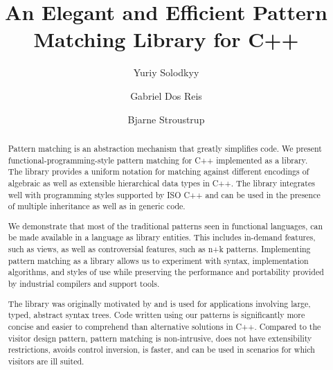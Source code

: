 \documentclass{llncs}
\makeatletter
\DeclareRobustCommand{\code}[1]{{\lstinline[keepspaces,breaklines=false,escapechar=@]{#1}}}
\makeatother
\begin{document}
%
\frontmatter          %
%
\pagestyle{headings}  %



\title{An Elegant and Efficient Pattern Matching Library for C++}

\author{Yuriy Solodkyy\and Gabriel Dos Reis\and Bjarne Stroustrup}
%
%
%

\maketitle              %

\begin{abstract}
Pattern matching is an abstraction mechanism that greatly simplifies code. We 
present functional-programming-style pattern matching for C++ implemented as a 
library. The library provides a uniform notation for matching against different 
encodings of algebraic as well as extensible hierarchical data types in C++. The 
library integrates well with programming styles supported by ISO C++ and can be 
used in the presence of multiple inheritance as well as in generic code.

We demonstrate that most of the traditional patterns seen in functional 
languages, can be made available in a language as library entities. This 
includes in-demand features, such as views, as well as controversial features, 
such as n+k patterns. Implementing pattern matching as a library allows us to 
experiment with syntax, implementation algorithms, and styles of use while 
preserving the performance and portability provided by industrial compilers and 
support tools.

The library was originally motivated by and is used for applications involving 
large, typed, abstract syntax trees. Code written using our patterns is 
significantly more concise  and easier to comprehend than alternative solutions 
in C++. Compared to the visitor 
design pattern, pattern matching is non-intrusive, 
does not have extensibility restrictions, avoids control inversion, is 
faster, and can be used in scenarios for which visitors are ill suited.
\end{abstract}
\end{document}

